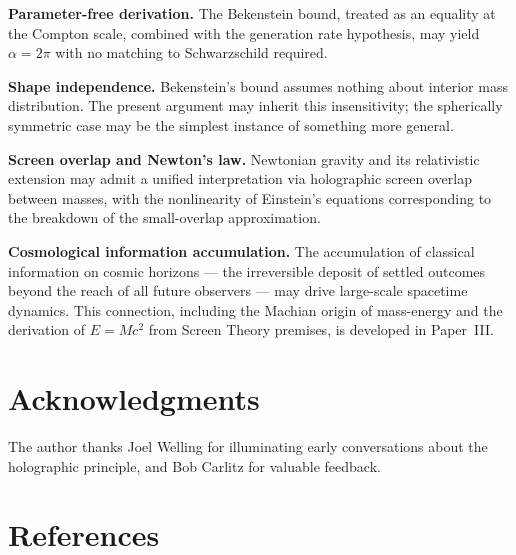 \documentclass[12pt]{article}
\begin{document}
\noindent\textbf{Parameter-free derivation.}
The Bekenstein bound, treated as an equality at the Compton scale,
combined with the generation rate hypothesis, may yield $\alpha = 2\pi$
with no matching to Schwarzschild required.

\medskip
\noindent\textbf{Shape independence.}
Bekenstein's bound assumes nothing about interior mass distribution.
The present argument may inherit this insensitivity; the spherically
symmetric case may be the simplest instance of something more general.

\medskip
\noindent\textbf{Screen overlap and Newton's law.}
Newtonian gravity and its relativistic extension may admit a unified
interpretation via holographic screen overlap between masses, with the
nonlinearity of Einstein's equations corresponding to the breakdown of
the small-overlap approximation.

\medskip
\noindent\textbf{Cosmological information accumulation.}
The accumulation of classical information on cosmic horizons --- the
irreversible deposit of settled outcomes beyond the reach of all future
observers --- may drive large-scale spacetime dynamics.
This connection, including the Machian origin of mass-energy and the
derivation of $E = Mc^2$ from Screen Theory premises, is developed in
Paper~III.

\section*{Acknowledgments}

The author thanks Joel Welling for illuminating early conversations
about the holographic principle, and Bob Carlitz for valuable feedback.

\section*{References}
\end{document}
